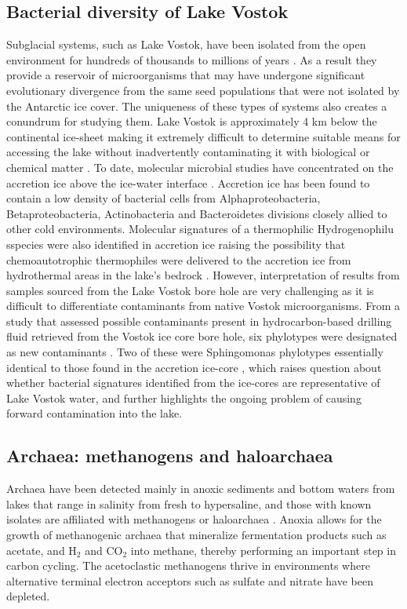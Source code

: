 \documentclass{book}
\begin{document}
\subsection{Bacterial diversity of Lake Vostok}
Subglacial systems, such as Lake Vostok, have been isolated from the open environment for hundreds of thousands to millions of years \cite{Siegert2001}.
As a result they provide a reservoir of microorganisms that may have undergone significant evolutionary divergence from the same seed populations that were not isolated by the Antarctic ice cover. 
The uniqueness of these types of systems also creates a conundrum for studying them. 
Lake Vostok is approximately 4 km below the continental ice-sheet making it extremely difficult to determine suitable means for accessing the lake without inadvertently contaminating it with biological
 or chemical matter \cite{Inman 2005, Wingham2006, Lukin2011, Gramling2012, Jones2012}. 
To date, molecular microbial studies have concentrated on the accretion ice above the ice-water interface \cite{Priscu1999, Christner2000}.
Accretion ice has been found to contain a low density of bacterial cells from Alphaproteobacteria, Betaproteobacteria, Actinobacteria and Bacteroidetes divisions closely allied to other cold environments.
Molecular signatures of a thermophilic Hydrogenophilu sspecies were also identified in accretion ice 
raising the possibility that chemoautotrophic thermophiles were delivered to the accretion ice from hydrothermal areas in the lake’s bedrock \cite{Bulat2004, Lavire2007}.
However, interpretation of results from samples sourced from the Lake Vostok bore hole are very challenging as it is difficult to differentiate contaminants from native Vostok microorganisms.
From a study that assessed possible contaminants present in hydrocarbon-based drilling fluid retrieved from the Vostok ice core bore hole, 
six phylotypes were designated as new contaminants \cite{Alekhina2007}. 
Two of these were Sphingomonas phylotypes essentially identical to those found in the accretion ice-core \cite{Christner2000},
 which raises question about whether bacterial signatures identified from the ice-cores are representative of Lake Vostok water,
 and further highlights the ongoing problem of causing forward contamination into the lake.

\subsection{Archaea: methanogens and haloarchaea}
Archaea have been detected mainly in anoxic sediments and bottom waters from lakes that range in salinity from fresh to hypersaline, 
and those with known isolates are affiliated with methanogens or haloarchaea \cite{Bowman2000a, Bowman2000b, Purdy2003, Kurasawa2010, Lauro2011}.
Anoxia allows for the growth of methanogenic archaea that mineralize fermentation products such as acetate, and H$_2$ and CO$_2$ into methane, thereby performing an important step in carbon cycling.
The acetoclastic methanogens thrive in environments where alternative terminal electron acceptors such as sulfate and nitrate have been depleted. 
\end{document}
